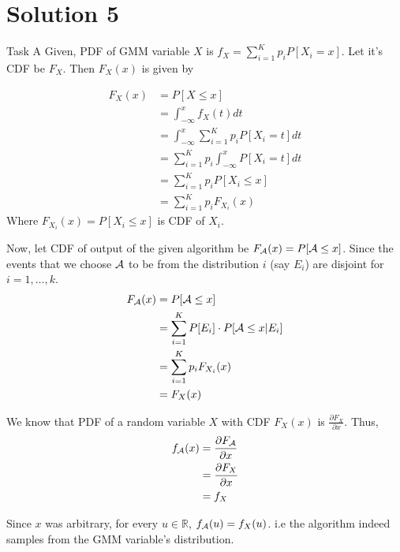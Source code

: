 \chapter{Solution 5}
\begin{task}{Task A}
	Given, PDF of GMM variable $X$ is $f_X = \sum_{i=1}^K p_iP[X_i=x]$. Let
	it's CDF be $F_X$. Then $F_X(x)$ is given by

	\begin{align}
		F_X(x) & = P[X\leq x]                                    \\
		       & = \int_{-\infty}^{x} f_X(t)dt                   \\
		       & = \int_{-\infty}^{x} \sum_{i=1}^K p_iP[X_i=t]dt \\
		       & = \sum_{i=1}^K p_i\int_{-\infty}^{x} P[X_i=t]dt \\
		       & = \sum_{i=1}^K p_iP[X_i\leq x]                  \\
		       & = \sum_{i=1}^K p_iF_{X_i}(x)
	\end{align}
	Where $F_{X_i}(x) = P[X_i\leq x]$ is CDF of $X_i$.

	Now, let CDF of output of the given algorithm be
	$F_{\mathcal{A}}(x) = P[\mathcal{A}\leq x]$. Since the events that we choose $\mathcal{A}$ to be
	from the distribution $i$ (say $E_i$) are disjoint for $i=1,\dots,k$.
	\begin{align}
		F_{\mathcal{A}}(x) & = P[\mathcal{A}\leq x]                                \\
		        & = \sum_{i=1}^K P[E_i]\cdot P[\mathcal{A}\leq x | E_i] \\
		        & = \sum_{i=1}^K p_iF_{X_i}(x)                 \\
		        & = F_X(x)
	\end{align}

	We know that PDF of a random variable $X$ with CDF $F_X(x)$ is
	$\frac{\partial F_X}{\partial x}$. Thus,
	\begin{align}
		f_{\mathcal{A}}(x) & = \frac{\partial F_{\mathcal{A}}}{\partial x} \\
		        & = \frac{\partial F_X}{\partial x}  \\
		        & = f_X
	\end{align}

	Since $x$ was arbitrary, for every $u\in\mathbb{R}$, $f_{\mathcal{A}}(u) =
		f_X(u)$. i.e the algorithm indeed samples from the GMM variable's
	distribution.
\end{task}



